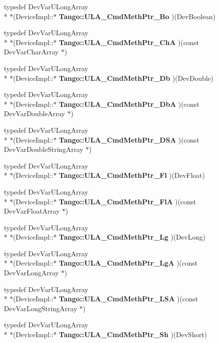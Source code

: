 \begin{DoxyCompactItemize}
\item 
typedef Dev\-Var\-U\-Long\-Array \\*
$\ast$(Device\-Impl\-::$\ast$ {\bf Tango\-::\-U\-L\-A\-\_\-\-Cmd\-Meth\-Ptr\-\_\-\-Bo} )(Dev\-Boolean)
\item 
typedef Dev\-Var\-U\-Long\-Array \\*
$\ast$(Device\-Impl\-::$\ast$ {\bf Tango\-::\-U\-L\-A\-\_\-\-Cmd\-Meth\-Ptr\-\_\-\-Ch\-A} )(const Dev\-Var\-Char\-Array $\ast$)
\item 
typedef Dev\-Var\-U\-Long\-Array \\*
$\ast$(Device\-Impl\-::$\ast$ {\bf Tango\-::\-U\-L\-A\-\_\-\-Cmd\-Meth\-Ptr\-\_\-\-Db} )(Dev\-Double)
\item 
typedef Dev\-Var\-U\-Long\-Array \\*
$\ast$(Device\-Impl\-::$\ast$ {\bf Tango\-::\-U\-L\-A\-\_\-\-Cmd\-Meth\-Ptr\-\_\-\-Db\-A} )(const Dev\-Var\-Double\-Array $\ast$)
\item 
typedef Dev\-Var\-U\-Long\-Array \\*
$\ast$(Device\-Impl\-::$\ast$ {\bf Tango\-::\-U\-L\-A\-\_\-\-Cmd\-Meth\-Ptr\-\_\-\-D\-S\-A} )(const Dev\-Var\-Double\-String\-Array $\ast$)
\item 
typedef Dev\-Var\-U\-Long\-Array \\*
$\ast$(Device\-Impl\-::$\ast$ {\bf Tango\-::\-U\-L\-A\-\_\-\-Cmd\-Meth\-Ptr\-\_\-\-Fl} )(Dev\-Float)
\item 
typedef Dev\-Var\-U\-Long\-Array \\*
$\ast$(Device\-Impl\-::$\ast$ {\bf Tango\-::\-U\-L\-A\-\_\-\-Cmd\-Meth\-Ptr\-\_\-\-Fl\-A} )(const Dev\-Var\-Float\-Array $\ast$)
\item 
typedef Dev\-Var\-U\-Long\-Array \\*
$\ast$(Device\-Impl\-::$\ast$ {\bf Tango\-::\-U\-L\-A\-\_\-\-Cmd\-Meth\-Ptr\-\_\-\-Lg} )(Dev\-Long)
\item 
typedef Dev\-Var\-U\-Long\-Array \\*
$\ast$(Device\-Impl\-::$\ast$ {\bf Tango\-::\-U\-L\-A\-\_\-\-Cmd\-Meth\-Ptr\-\_\-\-Lg\-A} )(const Dev\-Var\-Long\-Array $\ast$)
\item 
typedef Dev\-Var\-U\-Long\-Array \\*
$\ast$(Device\-Impl\-::$\ast$ {\bf Tango\-::\-U\-L\-A\-\_\-\-Cmd\-Meth\-Ptr\-\_\-\-L\-S\-A} )(const Dev\-Var\-Long\-String\-Array $\ast$)
\item 
typedef Dev\-Var\-U\-Long\-Array \\*
$\ast$(Device\-Impl\-::$\ast$ {\bf Tango\-::\-U\-L\-A\-\_\-\-Cmd\-Meth\-Ptr\-\_\-\-Sh} )(Dev\-Short)

\end{DoxyCompactItemize}
